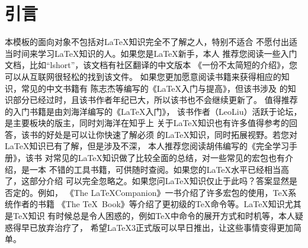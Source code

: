 ﻿\chapter{引\hspace{1em}言}

本模板的面向对象不包括对\LaTeX 知识完全不了解之人，特别不适合%
不愿付出适当时间来学习\LaTeX 知识的人。如果您是\LaTeX 新手，本人%
推荐您阅读一些入门文档，比如“lshort”，该文档有社区翻译的中文版本%
《一份不太简短的\LaTeXe 介绍》，您可以从互联网很轻松的找到该文件。%
如果您更加愿意阅读书籍来获得相应的知识，常见的中文书籍有%
陈志杰等编写的《\LaTeX 入门与提高》，但该书涉及%
的知识部分已经过时，且该书作者年纪已大，所以该书也不会继续更新了。%
值得推荐的入门书籍是由刘海洋编写的《\LaTeX 入门》，%
该书作者（LeoLiu）活跃于\CTeX 论坛，是主要板块的版主，同时刘海洋在知乎上%
关于\LaTeX 知识也有许多值得参考的回答，该书的好处是可以让你快速了解必须%
的\LaTeX 知识，同时拓展视野。若您对\LaTeX 知识已有了解，但是涉及不深，%
本人推荐您阅读胡伟编写的《\LaTeXe 完全学习手册》，该书%
对常见的\LaTeX 知识做了比较全面的总结，对一些常见的宏包也有介绍，是一本%
不错的工具书籍，可供随时查阅。如果您的\LaTeX 水平已经相当高了，这部分介绍%
可以完全忽略之。如果您问\LaTeX 知识仅止于此吗？答案显然是否定的。例如，%
《The \LaTeX Companion》一书介绍了许多宏包的使用，\TeX 系统作者的书籍%
《The \TeX\ Book》等介绍了更初级的\TeX 命令等。\LaTeX 知识尤其是\TeX 知识%
有时候总是令人困惑的，例如\TeX 中命令的展开方式和时机等，本人疑惑得早已放弃治疗了，%
希望\LaTeX3正式版可以早日推出，让这些事情变得更加简单。

